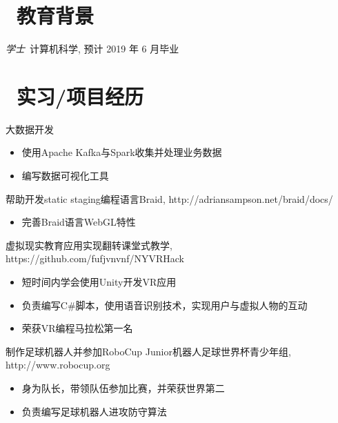 \documentclass{resume}
\begin{document}


 
\section{\faGraduationCap\  教育背景}
\textit{学士}\ 计算机科学, 预计 2019 年 6 月毕业

\section{\faUsers\ 实习/项目经历}
\role{实习}{}
大数据开发
\begin{itemize}
  \item 使用Apache Kafka与Spark收集并处理业务数据
  \item 编写数据可视化工具
\end{itemize}

帮助开发static staging编程语言Braid, http://adriansampson.net/braid/docs/
\begin{itemize}
  \item 完善Braid语言WebGL特性
\end{itemize}

\begin{onehalfspacing}
虚拟现实教育应用实现翻转课堂式教学, https://github.com/fufjvnvnf/NYVRHack
\begin{itemize}
  \item 短时间内学会使用Unity开发VR应用
  \item 负责编写C\#脚本，使用语音识别技术，实现用户与虚拟人物的互动
  \item 荣获VR编程马拉松第一名
\end{itemize}
\end{onehalfspacing}

\begin{onehalfspacing}
制作足球机器人并参加RoboCup Junior机器人足球世界杯青少年组, http://www.robocup.org
\begin{itemize}
  \item 身为队长，带领队伍参加比赛，并荣获世界第二
  \item 负责编写足球机器人进攻防守算法
\end{itemize}
\end{onehalfspacing}
\end{document}
